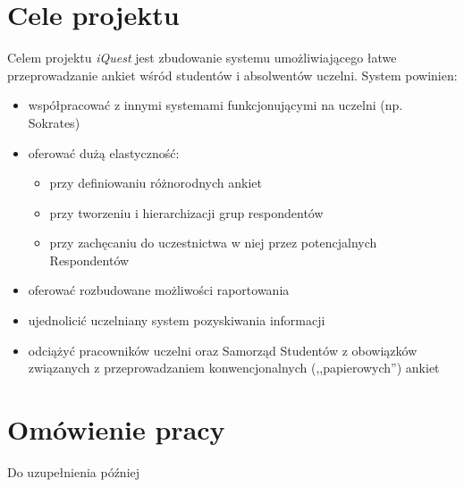 \section{Cele projektu}
Celem projektu \textit{iQuest} jest zbudowanie systemu umożliwiającego łatwe przeprowadzanie ankiet wśród studentów i absolwentów uczelni. System powinien:
\begin{itemize}
\item{współpracować z innymi systemami funkcjonującymi na uczelni (np. Sokrates)}
\item{oferować dużą elastyczność:
\begin{itemize}
\item{przy definiowaniu różnorodnych ankiet}
\item{przy tworzeniu i hierarchizacji grup respondentów}
\item{przy zachęcaniu do uczestnictwa w niej przez potencjalnych Respondentów}
\end{itemize}}
\item{oferować rozbudowane możliwości raportowania}
\item{ujednolicić uczelniany system pozyskiwania informacji}
\item{odciążyć pracowników uczelni oraz Samorząd Studentów z obowiązków związanych z przeprowadzaniem konwencjonalnych (,,papierowych'') ankiet}
\end{itemize}

\section{Omówienie pracy}
\label{Chapter12}

{\color{red}Do uzupełnienia później}

